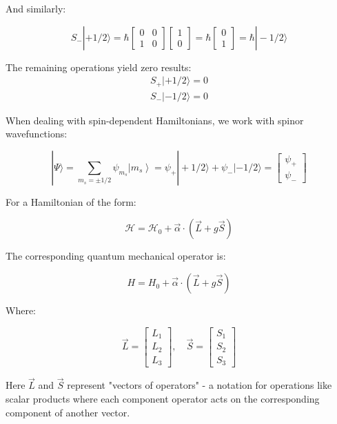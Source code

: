 \documentclass[italian]{HKNdocument}
\begin{document}
And similarly:

\[
S_{-}|+1/2\rangle=\hbar\left[\begin{array}{ll}
0 & 0  \\
1 & 0
\end{array}\right]\left[\begin{array}{l}
1 \\
0
\end{array}\right]=\hbar\left[\begin{array}{l}
0 \\
1
\end{array}\right]=\hbar|-1/2\rangle
\]


The remaining operations yield zero results:
\begin{align}
S_+|+1/2\rangle = 0\\
S_-|-1/2\rangle = 0
\end{align}

When dealing with spin-dependent Hamiltonians, we work with spinor wavefunctions:

\[
|\Psi\rangle=\sum_{m_{s}= \pm 1/2} \psi_{m_{s}}\left|m_{s}\right\rangle=\psi_{+}|+1/2\rangle+\psi_{-}|-1/2\rangle=\left[\begin{array}{l}
\psi_{+}  \\
\psi_{-}
\end{array}\right]
\]

For a Hamiltonian of the form:

\begin{equation}
\mathcal{H}=\mathcal{H}_{0}+\vec{\alpha} \cdot(\vec{L}+g \vec{S})
\end{equation}

The corresponding quantum mechanical operator is:

\begin{equation}
H=H_{0}+\vec{\alpha} \cdot(\vec{L}+g \vec{S})
\end{equation}

Where:

\[
\vec{L}=\left[\begin{array}{l}
L_{1}  \\
L_{2} \\
L_{3}
\end{array}\right], \quad \vec{S}=\left[\begin{array}{l}
S_{1} \\
S_{2} \\
S_{3}
\end{array}\right]
\]

Here $\vec{L}$ and $\vec{S}$ represent "vectors of operators" - a notation for operations like scalar products where each component operator acts on the corresponding component of another vector.
\end{document}
